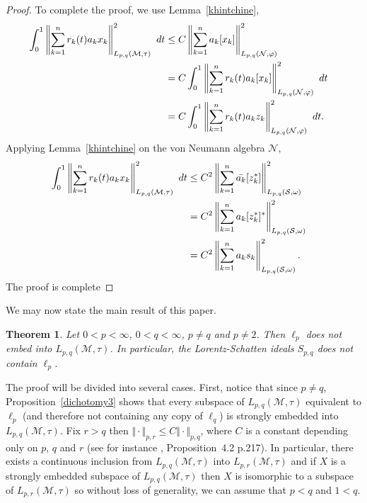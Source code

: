 \documentclass[12pt]{amsart}
\let\cal\mathcal
\newtheorem{theorem}{Theorem}
\def\m{{\cal M}}
\numberwithin{equation}{section}
\numberwithin{theorem}{section}
\begin{document}
\begin{proof}
To complete the proof, we use  Lemma~\ref{khintchine},
\begin{equation*}\begin{split}
\int_{0}^1 \left\Vert \sum_{k=1}^n r_k(t) a_{k} x_{k} \right\Vert_{L_{p,q}(\m,\tau)}^2
\ dt
&\leq C\left\Vert \sum_{k=1}^n a_k [x_k] 
\right\Vert_{L_{p,q}(\cal N, \varphi)}^2 \cr
&=C\int_{0}^1 \left\Vert \sum_{k=1}^n r_k(t)a_k [x_k] 
\right\Vert_{L_{p,q}(\cal N, \varphi)}^2 \ dt \cr
&=C\int_{0}^1 \left\Vert \sum_{k=1}^n r_k(t)a_k z_k 
\right\Vert_{L_{p,q}(\cal N, \varphi)}^2 \ dt.
\end{split}
\end{equation*}
Applying Lemma~\ref{khintchine} on the von Neumann algebra $\cal N$,
\begin{equation*}
\begin{split}
\int_{0}^1 \left\Vert \sum_{k=1}^n r_k(t) a_{k} x_{k} \right\Vert_{L_{p,q}(\m,\tau)}^2
\ dt
&\leq C^2 \left\Vert \sum_{k=1}^n \bar{a_k} [z_{k}^*] 
\right\Vert_{L_{p,q}(\cal S, \omega)}^2  \cr
&=C^2 \left\Vert \sum_{k=1}^n {a_k} [z_{k}^*]^* 
\right\Vert_{L_{p,q}(\cal S, \omega)}^2  \cr
&=C^2 \left\Vert \sum_{k=1}^n {a_k} s_k 
\right\Vert_{L_{p,q}(\cal S, \omega)}^2.  
\end{split}\end{equation*}
The proof is complete
\end{proof}

\smallskip

We may now state the main result of this paper.

\begin{theorem}
Let $0<p<\infty$, $0<q<\infty$, $p\neq q$ and $p\neq 2$. Then
$\ell_p$ does not embed into $L_{p,q}(\m,\tau)$. In particular,
the Lorentz-Schatten  ideals $S_{p,q}$ does not contain $\ell_p$.
\end{theorem}

The proof will be divided into several cases. First, notice that since 
$p\neq q$, Proposition~\ref{dichotomy3} shows that every subspace of
$L_{p,q}(\m,\tau)$ equivalent to $\ell_p$ (and therefore
not containing any copy of $\ell_q$) is strongly embedded into $L_{p,q}(\m,\tau)$.
Fix $r>q$ then $\Vert \cdot \Vert_{p,r} \leq C\Vert \cdot \Vert_{p,q}$,
where $C$ is a constant depending only on $p$, $q$ and $r$ (see
for instance \cite{BENSHA}, Proposition~4.2 p.217). In particular, 
there exists a continuous inclusion from $L_{p,q}(\m,\tau)$ into
$L_{p,r}(\m,\tau)$ and if $X$ is a strongly embedded subspace of 
$L_{p,q}(\m,\tau)$ then $X$ is isomorphic to a subspace of 
$L_{p,r}(\m,\tau)$ so without loss of generality, we can assume that
$p<q$ and $1<q$. 
\end{document}

